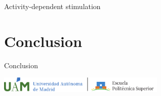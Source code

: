 \documentclass[aspectratio=43]{beamer}
\begin{document}
\begin{frame}{Activity-dependent stimulation}
\end{frame}


\section{Conclusion}

    \begin{frame}{Conclusion}
    \end{frame}
\begin{frame}[plain,t]
\vspace{100pt}
\centering
\includegraphics[width=0.6\textwidth]{logos/UAM+EPS_L-eps-converted-to.pdf}
\end{frame}
\end{document}
